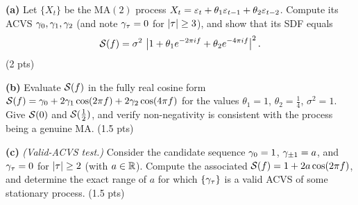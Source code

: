 \documentclass[11pt]{article}
\begin{document}
\textbf{(a)} Let $\{X_t\}$ be the $\mathrm{MA}(2)$ process $X_t=\varepsilon_t+\theta_1\varepsilon_{t-1}+\theta_2\varepsilon_{t-2}$. Compute its ACVS $\gamma_0,\gamma_1,\gamma_2$ (and note $\gamma_\tau=0$ for $\left\lvert \tau \right\rvert\ge3$), and show that its SDF equals
\[
\mathcal{S}(f)=\sigma^2\,\left\lvert 1+\theta_1 e^{-2\pi i f}+\theta_2 e^{-4\pi i f} \right\rvert^2 .
\]
\hfill(2 pts)

\textbf{(b)} Evaluate $\mathcal{S}(f)$ in the fully real cosine form $\mathcal{S}(f)=\gamma_0+2\gamma_1\cos(2\pi f)+2\gamma_2\cos(4\pi f)$ for the values $\theta_1=1$, $\theta_2=\tfrac14$, $\sigma^2=1$. Give $\mathcal{S}(0)$ and $\mathcal{S}(\tfrac12)$, and verify non-negativity is consistent with the process being a genuine MA. \hfill(1.5 pts)

\textbf{(c)} \emph{(Valid-ACVS test.)} Consider the candidate sequence $\gamma_0=1$, $\gamma_{\pm1}=a$, and $\gamma_\tau=0$ for $\left\lvert \tau \right\rvert\ge2$ (with $a\in\mathbb{R}$). Compute the associated $\mathcal{S}(f)=1+2a\cos(2\pi f)$, and determine the exact range of $a$ for which $\{\gamma_\tau\}$ is a valid ACVS of some stationary process. \hfill(1.5 pts)
\answerpage
\end{document}
